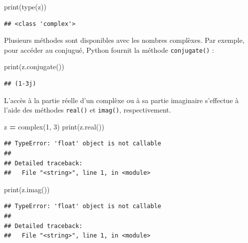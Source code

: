 \documentclass[12pt,]{book}
\newenvironment{Shaded}{\begin{snugshade}}{\end{snugshade}}
\newcommand{\DecValTok}[1]{\textcolor[rgb]{0.00,0.00,0.81}{#1}}
\newcommand{\OperatorTok}[1]{\textcolor[rgb]{0.81,0.36,0.00}{\textbf{#1}}}
\newcommand{\BuiltInTok}[1]{#1}
\newcommand{\NormalTok}[1]{#1}
\numberwithin{equation}{section}
\numberwithin{countremarque}{section}
\begin{document}
\begin{Shaded}
\begin{Highlighting}[]
\BuiltInTok{print}\NormalTok{(}\BuiltInTok{type}\NormalTok{(z))}
\end{Highlighting}
\end{Shaded}

\begin{lstlisting}
## <class 'complex'>
\end{lstlisting}

Plusieurs méthodes sont disponibles avec les nombres complèxes. Par
exemple, pour accéder au conjugué, Python fournit la méthode
\texttt{conjugate()} :

\begin{Shaded}
\begin{Highlighting}[]
\BuiltInTok{print}\NormalTok{(z.conjugate())}
\end{Highlighting}
\end{Shaded}

\begin{lstlisting}
## (1-3j)
\end{lstlisting}

L'accès à la partie réelle d'un complèxe ou à sa partie imaginaire
s'effectue à l'aide des méthodes \texttt{real()} et \texttt{imag()},
respectivement.

\begin{Shaded}
\begin{Highlighting}[]
\NormalTok{z }\OperatorTok{=} \BuiltInTok{complex}\NormalTok{(}\DecValTok{1}\NormalTok{, }\DecValTok{3}\NormalTok{)}
\BuiltInTok{print}\NormalTok{(z.real())}
\end{Highlighting}
\end{Shaded}

\begin{lstlisting}
## TypeError: 'float' object is not callable
## 
## Detailed traceback: 
##   File "<string>", line 1, in <module>
\end{lstlisting}

\begin{Shaded}
\begin{Highlighting}[]
\BuiltInTok{print}\NormalTok{(z.imag())}
\end{Highlighting}
\end{Shaded}

\begin{lstlisting}
## TypeError: 'float' object is not callable
## 
## Detailed traceback: 
##   File "<string>", line 1, in <module>
\end{lstlisting}
\end{document}
